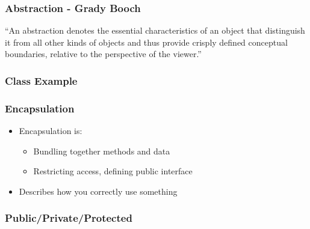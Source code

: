 \subsubsection{Abstraction - Grady
Booch}\label{abstraction---grady-booch}

``An abstraction denotes the essential characteristics of an object that
distinguish it from all other kinds of objects and thus provide crisply
defined conceptual boundaries, relative to the perspective of the
viewer.''

\subsubsection{Class Example}\label{class-example}

\begin{Shaded}
\begin{Highlighting}[]
 
\NormalTok{:}
   
   
\NormalTok{\};}

  
\NormalTok{\{}
\NormalTok{\}}
\end{Highlighting}
\end{Shaded}

\subsubsection{Encapsulation}\label{encapsulation}

\begin{itemize}
\itemsep1pt\parskip0pt
\item
  Encapsulation is:

  \begin{itemize}
  \itemsep1pt\parskip0pt
  \item
    Bundling together methods and data
  \item
    Restricting access, defining public interface
  \end{itemize}
\item
  Describes how you correctly use something
\end{itemize}

\subsubsection{Public/Private/Protected}\label{publicprivateprotected}

